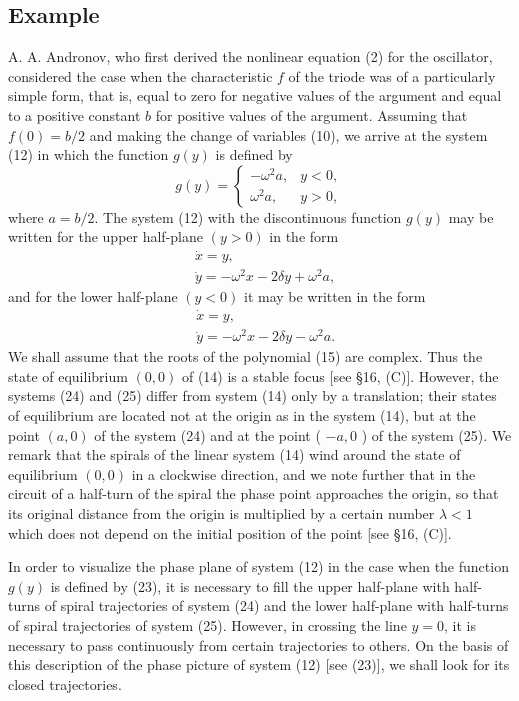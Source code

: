 \documentclass[10pt,a5paper]{book}
\theoremstyle{plain}
\theoremstyle{definition}
\theoremstyle{remark}
\begin{document}
\subsection*{Example}
A. A. Andronov, who first derived the nonlinear equation (2) for the oscillator, considered the case when the characteristic $f$ of the triode was of a particularly simple form, that is, equal to zero for negative values of the argument and equal to a positive constant $b$ for positive values of the argument. Assuming that $f(0)=b / 2$ and making the change of variables (10), we arrive at the system (12) in which the function $g(y)$ is defined by
\[
g(y)=\left\{\begin{array}{rc}
-\omega^{2} a, & y<0,  \tag{23}\\
\omega^{2} a, & y>0,
\end{array}\right.
\]
where $a=b / 2$. The system (12) with the discontinuous function $g(y)$ may be written for the upper half-plane $(y>0)$ in the form
\begin{align*}
& \dot{x}=y, \\
& \dot{y}=-\omega^{2} x-2 \delta y+\omega^{2} a, \tag{24}
\end{align*}
and for the lower half-plane $(y<0)$ it may be written in the form
\begin{align*}
& \dot{x}=y, \\
& \dot{y}=-\omega^{2} x-2 \delta y-\omega^{2} a . \tag{25}
\end{align*}
We shall assume that the roots of the polynomial (15) are complex. Thus the state of equilibrium $(0,0)$ of (14) is a stable focus [see §16, (C)]. However, the systems (24) and (25) differ from system (14) only by a translation; their states of equilibrium are located not at the origin as in the system (14), but at the point $(a, 0)$ of the system (24) and at the
point ( $-a, 0$ ) of the system (25). We remark that the spirals of the linear system (14) wind around the state of equilibrium $(0,0)$ in a clockwise direction, and we note further that in the circuit of a half-turn of the spiral the phase point approaches the origin, so that its original distance from the origin is multiplied by a certain number $\lambda<1$ which does not depend on the initial position of the point [see §16, (C)].

In order to visualize the phase plane of system (12) in the case when the function $g(y)$ is defined by (23), it is necessary to fill the upper half-plane with half-turns of spiral trajectories of system (24) and the lower half-plane with half-turns of spiral trajectories of system (25). However, in crossing the line $y=0$, it is necessary to pass continuously from certain trajectories to others. On the basis of this description of the phase picture of system (12) [see (23)], we shall look for its closed trajectories.
\end{document}
